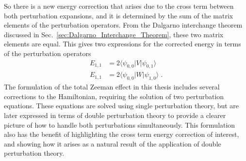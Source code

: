         So there is a new energy correction that arises due to the cross term between both perturbation expansions, and it is determined by the sum of the matrix elements of the perturbation operators. From the Dalgarno interchange theorem discussed in Sec.~\ref{sec:Dalgarno_Interchange_Theorem}, these two matrix elements are equal. This gives two expressions for the corrected energy in terms of the perturbation operators
        \begin{align}
            E_{1,1} &= 2  \langle \psi_{0,0} \vert V \vert \psi_{0,1} \rangle\\
            E_{1,1} &= 2 \langle \psi_{0,0} \vert W \vert \psi_{1,0} \rangle\;.
        \end{align}
        The formulation of the total Zeeman effect in this thesis includes several corrections to the Hamiltonian, requiring the solution of two perturbation equations. These equations are solved using single perturbation theory, but are later expressed in terms of double perturbation theory to provide a clearer picture of how to handle both perturbations simultaneously. This formulation also has the benefit of highlighting the cross term energy correction of interest, and showing how it arises as a natural result of the application of double perturbation theory. 
    
    